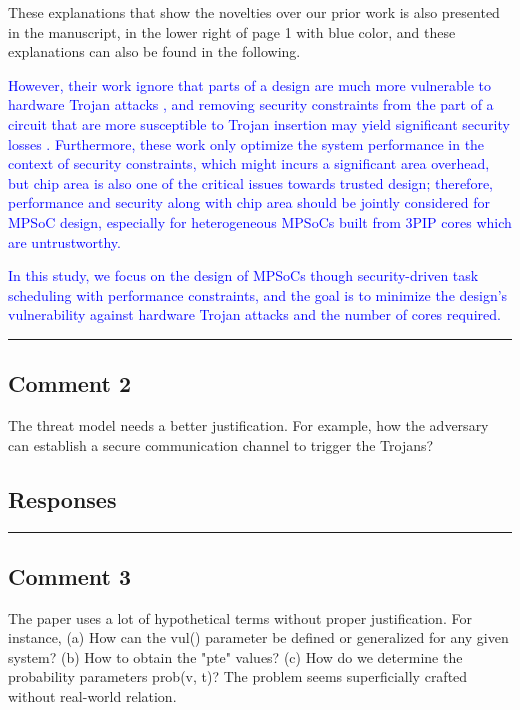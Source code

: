 \documentclass[10pt,journal, compsoc]{IEEEtran}
\begin{document}
These explanations that show the novelties over our prior work is also presented in the manuscript, in the lower right of page 1 with blue color, and these explanations can also be found in the following.

\textcolor{blue}{However, their work ignore that parts of a design are much more vulnerable to hardware Trojan attacks \cite{conference:HS}, and removing security constraints from the part of a circuit that are more susceptible to Trojan insertion may yield significant security losses \cite{article:XC}. Furthermore, these work only optimize the system performance in the context of security constraints, which might incurs a significant area overhead, but chip area is also one of the critical issues towards trusted design; therefore, performance and security along with chip area should be jointly considered for MPSoC design, especially for heterogeneous MPSoCs built from 3PIP cores which are untrustworthy.}

\textcolor{blue}{In this study, we focus on the design of MPSoCs though security-driven task scheduling with performance constraints, and the goal is to minimize the design's vulnerability against hardware Trojan attacks and the number of cores required.}

\noindent\rule[0.25\baselineskip]{252pt}{1pt}


\subsection*{Comment 2}
The threat model needs a better justification. For example, how the adversary can establish a secure communication channel to trigger the Trojans?

\subsection*{Responses}


\noindent\rule[0.25\baselineskip]{252pt}{1pt}


\subsection*{Comment 3}
The paper uses a lot of hypothetical terms without proper justification. For instance, (a) How can the vul() parameter be defined or generalized for any given system? (b) How to obtain the "pte" values? (c) How do we determine the probability parameters prob(v, t)? The problem seems superficially crafted without real-world relation.
\end{document}
